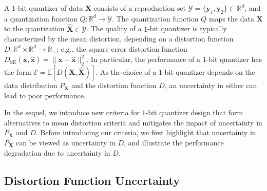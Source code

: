 \documentclass[conference]{IEEEtran}
\begin{document}
A $1$-bit quantizer of data $\mathbf{X}$ consists of a reproduction set $\mathcal{Y} = \{\mathbf{y}_1,\mathbf{y}_2\} \subset \mathbb{R}^d$, and a quantization function $Q: \mathbb{R}^d \rightarrow \mathcal{Y}$. The quantization function $Q$ maps the data $\mathbf{X}$ to the quantization $\hat{\mathbf{X}} \in \mathcal{Y}$. The quality of a $1$-bit quantizer is typically characterized by the mean distortion, depending on a distortion function $D: \mathbb{R}^d \times \mathbb{R}^d \rightarrow \mathbb{R}_+$; e.g., the square error distortion function $D_{\mathrm{SE}}(\mathbf{x},\hat{\mathbf{x}}) = \|\mathbf{x} - \hat{\mathbf{x}}\|_2^2$. In particular, the performance of a $1$-bit quantizer has the form $\mathcal{E} = \mathbb{E}[D(\mathbf{X},\hat{\mathbf{X}})]$. As the choice of a $1$-bit quantizer depends on the data distribution $P_{\mathbf{X}}$ and the distortion function $D$, an uncertainty in either can lead to poor performance. %

In the sequel, we introduce new criteria for $1$-bit quantizer design that form alternatives to mean distortion criteria and mitigates the impact of uncertainty in $P_{\mathbf{X}}$ and $D$. Before introducing our criteria, we first highlight that uncertainty in $P_{\mathbf{X}}$ can be viewed as uncertainty in $D$, and illustrate the performance degradation due to uncertainty in $D$.   

\subsection{Distortion Function Uncertainty}\label{sec:p_X_uncertainty}
\end{document}
